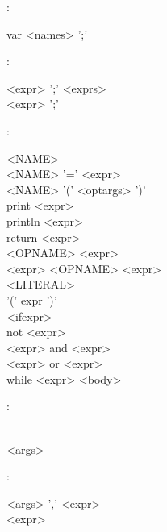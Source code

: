 \documentclass[12pt]{article}
\newcommand{\bs}[2]{%
\begin{minipage}{5in}%
\begin{syntdiag*}[\left{#1}\right{#2}][5in]%
}
\newcommand{\es}{\end{syntdiag*}\end{minipage}}
\begin{document}
\begin{framed}
:\\
\indent \bs {>>-} {-><} 
var <names> ';' 
\es
\end{framed}

\begin{framed}
:\\
\indent \bs {>>-} {-><} 
\begin{stack} 
	<expr> ';' <exprs>\\
	 <expr> ';' 
\end{stack} 
\es
\end{framed}

\begin{framed}
:\\
\indent \bs {>>-} {-><} 
\begin{stack} 
	<NAME>\\ 
	<NAME> '=' <expr> \\
	<NAME> '(' <optargs> ')' \\
	print <expr> \\
	println <expr> \\
	return <expr> \\
	<OPNAME> <expr> \\
	<expr> <OPNAME> <expr> \\
	<LITERAL> \\
	'(' expr ')' \\
	<ifexpr> \\
	not <expr> \\
	<expr> and <expr> \\
	<expr> or <expr> \\
	while <expr> <body>	 
\end{stack} 
\es
\end{framed}

\begin{framed}
:\\
\indent \bs {>>-} {-><} 
\begin{stack} 
	\\ 
	<args> 
\end{stack} 
\es
\end{framed}

\begin{framed}
:\\
\indent \bs {>>-} {-><} 
\begin{stack} 
	<args> ',' <expr>\\ 
	<expr> 
\end{stack} 
\es
\end{framed}
\end{document}

